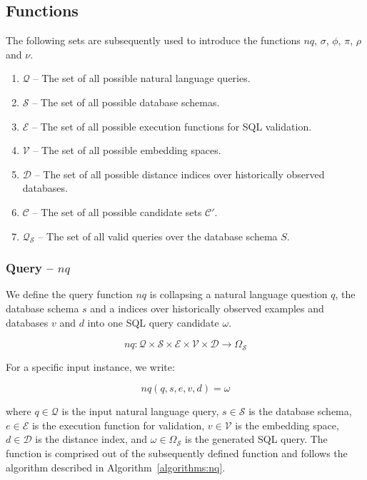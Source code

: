 \subsection{Functions}\label{design:components}

The following sets are subsequently used to introduce the functions $nq$, $\sigma$, $\phi$, $\pi$, $\rho$ and $\nu$.

\begin{enumerate}
    \item $\mathcal{Q}$ – The set of all possible natural language queries.
    \item $\mathcal{S}$ – The set of all possible database schemas.
    \item $\mathcal{E}$ – The set of all possible execution functions for SQL validation.
    \item $\mathcal{V}$ – The set of all possible embedding spaces.
    \item $\mathcal{D}$ – The set of all possible distance indices over historically observed databases.
    \item $\mathcal{C}$ – The set of all possible candidate sets $\mathcal{C}'$.
    \item $\mathcal{Q}_{\mathcal{S}}$ – The set of all valid queries over the database schema $S$.
\end{enumerate}

\subsubsection{Query – $nq$}

We define the query function $nq$ is collapsing a natural language question $q$,
the database schema $s$ and a indices over historically observed examples and
databases $v$ and $d$ into one SQL query candidate $\omega$.

$$
nq: \mathcal{Q} \times \mathcal{S} \times \mathcal{E} \times \mathcal{V} \times \mathcal{D} \rightarrow \Omega_{\mathcal{S}}
$$

\vspace{0.5em}

For a specific input instance, we write:

$$
nq(q, s, e, v, d) = \omega
$$

\vspace{0.5em}

where $q \in \mathcal{Q}$ is the input natural language query, $s \in \mathcal{S}$
is the database schema, $e \in \mathcal{E}$ is the execution function for validation,
$v \in \mathcal{V}$ is the embedding space, $d \in \mathcal{D}$ is the distance index,
and $\omega \in \Omega_{\mathcal{S}}$ is the generated SQL query. The function is comprised
out of the subsequently defined function and follows the algorithm described in Algorithm~\ref{algorithms:nq}.

